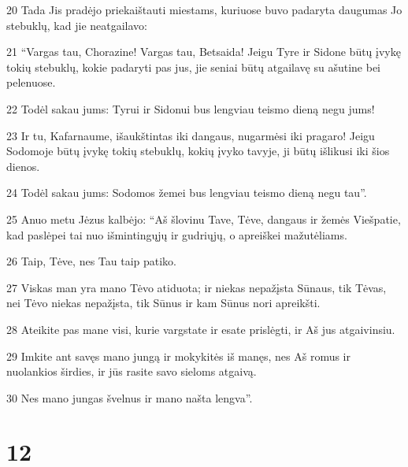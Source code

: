 \par 20 Tada Jis pradėjo priekaištauti miestams, kuriuose buvo padaryta daugumas Jo stebuklų, kad jie neatgailavo: 
\par 21 “Vargas tau, Chorazine! Vargas tau, Betsaida! Jeigu Tyre ir Sidone būtų įvykę tokių stebuklų, kokie padaryti pas jus, jie seniai būtų atgailavę su ašutine bei pelenuose. 
\par 22 Todėl sakau jums: Tyrui ir Sidonui bus lengviau teismo dieną negu jums! 
\par 23 Ir tu, Kafarnaume, išaukštintas iki dangaus, nugarmėsi iki pragaro! Jeigu Sodomoje būtų įvykę tokių stebuklų, kokių įvyko tavyje, ji būtų išlikusi iki šios dienos. 
\par 24 Todėl sakau jums: Sodomos žemei bus lengviau teismo dieną negu tau”. 
\par 25 Anuo metu Jėzus kalbėjo: “Aš šlovinu Tave, Tėve, dangaus ir žemės Viešpatie, kad paslėpei tai nuo išmintingųjų ir gudriųjų, o apreiškei mažutėliams. 
\par 26 Taip, Tėve, nes Tau taip patiko. 
\par 27 Viskas man yra mano Tėvo atiduota; ir niekas nepažįsta Sūnaus, tik Tėvas, nei Tėvo niekas nepažįsta, tik Sūnus ir kam Sūnus nori apreikšti. 
\par 28 Ateikite pas mane visi, kurie vargstate ir esate prislėgti, ir Aš jus atgaivinsiu. 
\par 29 Imkite ant savęs mano jungą ir mokykitės iš manęs, nes Aš romus ir nuolankios širdies, ir jūs rasite savo sieloms atgaivą. 
\par 30 Nes mano jungas švelnus ir mano našta lengva”.



\chapter{12}


